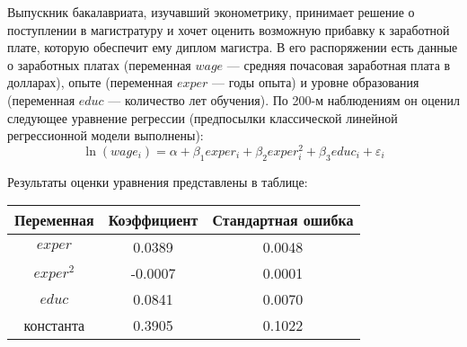 \documentclass[addpoints]{exam} %
\DeclareMathOperator{\E}{\mathbb{E}}
\DeclareMathOperator{\Var}{\mathbb{V}\mathrm{ar}}
\begin{document}
\begin{questions}


\question
Выпускник бакалавриата, изучавший эконометрику, принимает решение о поступлении в магистратуру и хочет оценить возможную прибавку к заработной плате, которую обеспечит ему диплом магистра. В его распоряжении есть данные о заработных платах (переменная $wage$ --- средняя почасовая заработная плата в долларах), опыте (переменная $exper$ --- годы опыта) и  уровне образования (переменная $educ$ --- количество лет обучения).  По 200-м наблюдениям он оценил следующее уравнение регрессии (предпосылки классической линейной регрессионной модели  выполнены):
\[
\ln(wage_i) = \alpha + \beta_1 exper_i + \beta_2 exper_i^2 + \beta_3 educ_i   + \varepsilon_i
\]

Результаты оценки уравнения представлены в таблице:
\begin{center}
\begin{tabular}{ccc} \toprule
Переменная & Коэффициент & Стандартная ошибка\\ \midrule
$exper$ & 0.0389 & 0.0048 \\
$exper^2$ & -0.0007 & 0.0001 \\
$educ$ & 0.0841 & 0.0070 \\
константа & 0.3905 & 0.1022 \\ \bottomrule
\end{tabular}
\end{center}


\end{questions}
\end{document}
